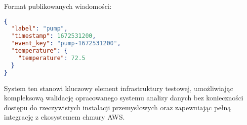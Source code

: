 Format publikowanych wiadomości:

\begin{lstlisting}[language=JSON, caption=Format publikowanych wiadomości]
{
  "label": "pump",
  "timestamp": 1672531200,
  "event_key": "pump-1672531200",
  "temperature": {
    "temperature": 72.5
  }
}
\end{lstlisting}


System ten stanowi kluczowy element infrastruktury testowej, umożliwiając kompleksową walidację opracowanego systemu analizy danych bez konieczności dostępu do rzeczywistych instalacji przemysłowych oraz zapewniając pełną integrację z ekosystemem chmury AWS.